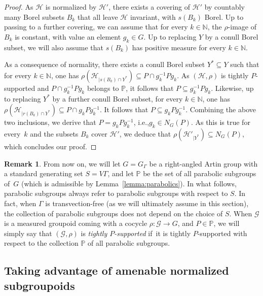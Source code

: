 \documentclass[11pt]{article}
\newcommand{\ie}{i.e.,\xspace}
\numberwithin{equation}{section}
\let\mathcal\mathscr
\theoremstyle{plain}
\theoremstyle{definition}
\newtheorem{rk}[theo]{Remark}
\newcommand{\calg}{\mathcal{G}}
\newcommand{\calh}{\mathcal{H}}
\begin{document}
\begin{proof}
As $\calh$ is normalized by $\calh'$, there exists a covering of $\calh'$ by countably many Borel subsets $B_k$ that all leave $\calh$ invariant, with $s(B_k)$ Borel. Up to passing to a further covering, we can assume that for every $k\in\mathbb{N}$, the $\rho$-image of $B_k$ is constant, with value an element $g_k\in G$. Up to replacing $Y$ by a conull Borel subset, we will also assume that $s(B_k)$ has positive measure for every $k\in\mathbb{N}$.

As a consequence of normality, there exists a conull Borel subset $Y^*\subseteq Y$ such that for every $k\in\mathbb{N}$, one has $\rho(\calh_{|s(B_k)\cap Y^*})\subseteq P\cap g_k^{-1}Pg_k$. As $(\calh,\rho)$ is tightly $P$\nobreakdash-sup\-ported and $P\cap g_k^{-1}Pg_k$ belongs to $\mathbb{P}$, it follows that $P\subseteq g_k^{-1}Pg_k$. Likewise, up to replacing $Y^*$ by a further conull Borel subset, for every $k\in\mathbb{N}$, one has $\rho(\calh_{|r(B_k)\cap Y^*})\!\subseteq\! P\cap g_kPg_k^{-1}$. It follows that $P\!\subseteq\! g_kPg_k^{-1}$. Combining the above two inclusions, we derive that $P\!=\!g_kPg_k^{-1}$, \ie $g_k\!\in\! N_G(P)$. As this is true for every~$k$ and the subsets $B_k$ cover $\calh'$, we deduce that $\rho(\calh'_{|Y^{\ast}}) \subseteq N_G(P)$, which concludes our proof.
\end{proof}

\begin{rk}\label{rk:support-raag}
From now on, we will let $G=G_\Gamma$ be a right-angled Artin group with a standard generating set $S=V\Gamma$, and let $\mathbb{P}$ be the set of all parabolic subgroups of~$G$ (which is admissible by Lemma~\ref{lemma:parabolics}). In what follows, parabolic subgroups always refer to parabolic subgroups with respect to $S$. In fact, when $\Gamma$ is transvection-free (as we will ultimately assume in this section), the collection of parabolic subgroups does not depend on the choice of $S$. When $\calg$ is a measured groupoid coming with a cocycle $\rho:\calg\to G$, and $P\in\mathbb{P}$, we will simply say that $(\calg,\rho)$ is \emph{tightly $P$-supported} if~it is tightly $P$-supported with respect to the collection $\mathbb{P}$ of all parabolic subgroups.
\end{rk}

\subsection{Taking advantage of amenable normalized subgroupoids}
\end{document}
